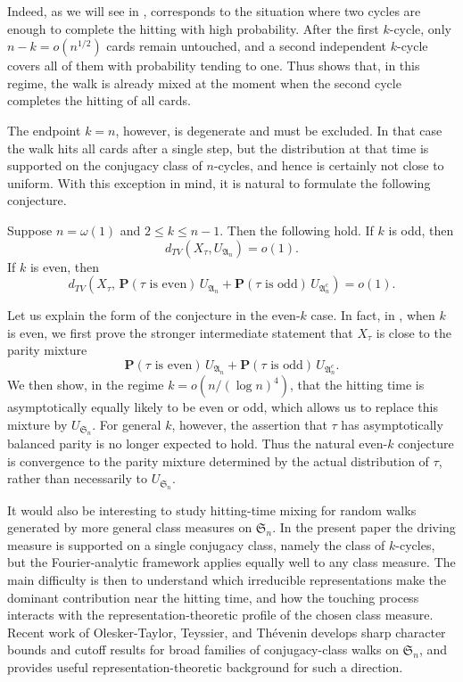 Indeed, as we will see in ,  corresponds to the situation where two cycles
are enough to complete the hitting with high probability. After the first
$k$-cycle, only $n-k=o(n^{1/2})$ cards remain untouched, and a second
independent $k$-cycle covers all of them with probability tending to one. Thus
 shows that, in this regime, the walk is already mixed at the moment
when the second cycle completes the hitting of all cards.

The endpoint $k=n$, however, is degenerate and must be excluded. In that case
the walk hits all cards after a single step, but the distribution at that time
is supported on the conjugacy class of $n$-cycles, and hence is certainly not
close to uniform. With this exception in mind, it is natural to formulate the
following conjecture.

\begin{conj}\label{conj: hitting time mixing all k}
Suppose $n=\omega(1)$ and $2\leq k\leq n-1$. Then the following hold. If $k$ is odd, then
$$
d_{TV}(X_\tau,U_{\mathfrak A_n})=o(1).
$$
If $k$ is even, then 
$$
d_{TV}\!\left(X_\tau,\,\mathbf P(\tau \text{ is even})\,U_{\mathfrak A_n}+\mathbf P(\tau \text{ is odd})\,U_{\mathfrak A_n^c}
\right)=o(1).
$$
\end{conj}

Let us explain the form of the conjecture in the even-\(k\) case. In fact, in , when \(k\) is even, we first prove the stronger intermediate statement that \(X_\tau\) is close to the parity mixture
$$
\mathbf P(\tau \text{ is even})\,U_{\mathfrak A_n}+
\mathbf P(\tau \text{ is odd})\,U_{\mathfrak A_n^c}.
$$
We then show, in the regime \(k=o(n/(\log n)^4)\), that the hitting time is asymptotically equally likely to be even or odd, which allows us to replace this mixture by \(U_{\mathfrak S_n}\). For general \(k\), however, the assertion that \(\tau\) has asymptotically balanced parity is no longer expected to hold. Thus the natural even-\(k\) conjecture is convergence to the parity mixture determined by the actual distribution of \(\tau\), rather than necessarily to \(U_{\mathfrak S_n}\).

It would also be interesting to study hitting-time mixing for random walks
generated by more general class measures on $\mathfrak S_n$. In the present
paper the driving measure is supported on a single conjugacy class, namely the
class of $k$-cycles, but the Fourier-analytic framework applies equally well
to any class measure. The main difficulty is then to understand which
irreducible representations make the dominant contribution near the hitting
time, and how the touching process interacts with the representation-theoretic
profile of the chosen class measure. Recent work of Olesker-Taylor, Teyssier,
and Th\'evenin \cite{olesker2025sharp} develops sharp character bounds
and cutoff results for broad families of conjugacy-class walks on
$\mathfrak S_n$, and provides useful representation-theoretic background for
such a direction.

